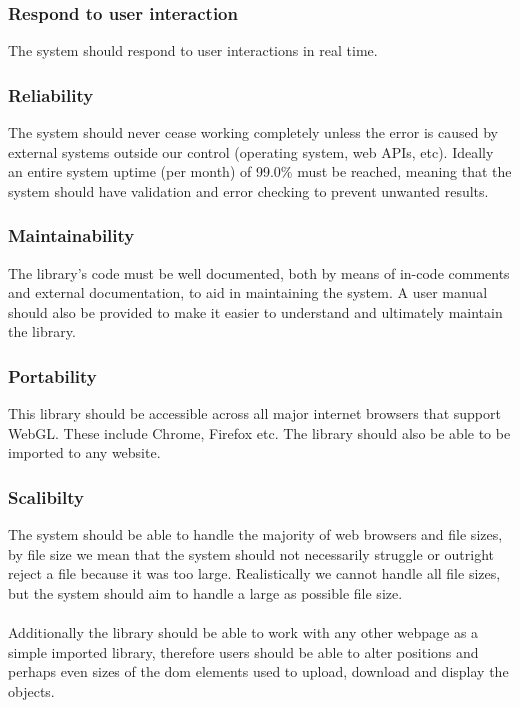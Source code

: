 \documentclass[english]{article}
\begin{document}
		\subsubsection{Respond to user interaction}
		The system should respond to user interactions in real time.
		
		\subsubsection{Reliability}
		The system should never cease working completely unless the error is caused by external systems outside our control (operating system, web APIs, etc). Ideally an entire system uptime (per month) of 99.0\% must be reached, meaning that the system should have validation and error checking to prevent unwanted results.
		
		\subsubsection{Maintainability}
		The library's code must be well documented, both by means of in-code comments and external documentation, to aid in 
		maintaining the system. A user manual should also be provided to make it easier to understand and ultimately maintain the library.
		
		\subsubsection{Portability}
		This library should be accessible across all major internet browsers that support WebGL. These include Chrome, Firefox etc.
		The library should also be able to be imported to any website.
		
		\subsubsection{Scalibilty}
		The system should be able to handle the majority of web browsers and file sizes, by file size we mean that the system should not necessarily struggle or outright reject a file because it was too large. Realistically we cannot handle all file sizes, but the system should aim to handle a large as possible file size. 
		\\\\
		Additionally the library should be able to work with any other webpage as a simple imported library, therefore users should be able to alter positions and perhaps even sizes of the dom elements used to upload, download and display the objects.
		
\end{document}
